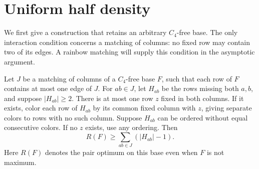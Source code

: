 \section{Uniform half density}\label{sec:uniform-density}

We first give a construction that retains an arbitrary $C_4$-free base.
The only interaction condition concerns a matching of columns: no fixed
row may contain two of its edges. A rainbow matching will supply this
condition in the asymptotic argument.

\begin{lemma}\label{lem:column-fans}
Let $J$ be a matching of columns of a $C_4$-free base $F$, such that each
row of $F$ contains at most one edge of $J$. For $ab\in J$, let $H_{ab}$
be the rows missing both $a,b$, and suppose $|H_{ab}|\ge2$.
There is at most one row $z$ fixed in both columns. If it exists, color
each row of $H_{ab}$ by its common fixed column with $z$, giving separate
colors to rows with no such column. Suppose $H_{ab}$ can be ordered
without equal consecutive colors. If no $z$ exists, use any ordering.
Then
\[
 R(F)\ge\sum_{ab\in J}(|H_{ab}|-1).
\]
Here $R(F)$ denotes the pair optimum on this base even when $F$ is not maximum.
\end{lemma}
